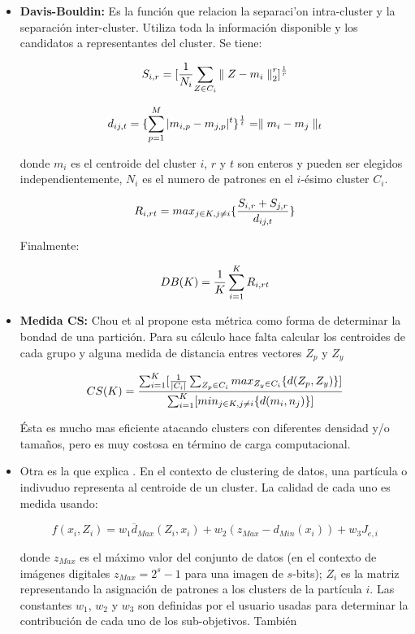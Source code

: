 \begin{itemize}

\item {\bf Davis-Bouldin:}
Es la funci\'on que relacion la separaci'on intra-cluster y la separaci\'on 
inter-cluster. Utiliza toda la informaci\'on disponible y los candidatos a representantes
del cluster. Se tiene:

\[
S_{i,r} = {[{ { {1} \over {N_i}} {\sum_{Z \in C_i} { \parallel Z - m_i \parallel }_2^r}} ]^{1 \over r}}
\]

\[
d_{ij,t} = \{ \sum_{p=1}^M |m_{i,p} - m_{j,p}|^t \} ^{1 \over t} = \parallel m_i - m_j \parallel_t
\]

donde $m_i$ es el centroide del cluster $i$, $r$ y $t$ son enteros y pueden ser elegidos
independientemente, $N_i$ es el numero de patrones en el $i$-\'esimo cluster $C_i$.

\[
R_{i,rt} = {max_{j \in K, j \neq i} \{ {{S_{i,r} + S_{j,r}} \over {d_{ij,t}}} \}}
\]

Finalmente:

\[
DB(K) = {1 \over K} \sum_{i=1}^K R_{i,rt}
\]

\item {\bf Medida CS:} Chou et al \cite{SwAjAm2009} propone esta m\'etrica como forma
de determinar la bondad de una partici\'on. Para su c\'alculo hace falta calcular los centroides
de cada grupo y alguna medida de distancia entres vectores $Z_p$ y $Z_y$

\[
CS(K) = {{\sum_{i=1}^K [{ 1 \over |C_i|} \sum_{Z_p \in C_i} max_{Z_y \in C_i} \{ d(Z_p,Z_y) \} ]} \over {\sum_{i=1}^K [min_{j \in K, j \neq i} \{ d(m_i, n_j) \}]}}
\]

\'Esta es mucho mas eficiente atacando clusters con diferentes densidad y/o tama\~nos,
pero es muy costosa en t\'ermino de carga computacional.

\item Otra es la que explica \cite{OmEnSa2005}. En el contexto de 
clustering de datos, una partícula o indivuduo representa
al centroide de un cluster. La calidad
de cada uno es medida usando:

\[
f(x_i,Z_i) = w_1 \overline{d}_{Max}(Z_i,x_i) + w_2 (z_{Max} - d_{Min}(x_i)) + w_3 J_{e,i}
\]

donde $z_{Max}$ es el máximo valor del conjunto de datos (en el contexto
de imágenes digitales $z_{Max} = 2^s - 1$ para una imagen de $s$-bits);
$Z_i$ es la matriz representando la asignación de patrones a los clusters
de la partícula $i$. Las constantes $w_1$, $w_2$ y $w_3$ son definidas por el usuario
usadas para determinar la contribución de cada uno de los sub-objetivos.
También


\end{itemize}
